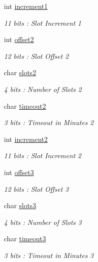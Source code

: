 \begin{DoxyCompactItemize}
int \mbox{\hyperlink{structaismsg__20_a73c4ecb586e692600dc98cc4655d29c2}{increment1}}
\begin{DoxyCompactList}\small\item\em 11 bits \+: Slot Increment 1 \end{DoxyCompactList}\item 
int \mbox{\hyperlink{structaismsg__20_a19dde01a8ac18f0a0d1521e455201fe0}{offset2}}
\begin{DoxyCompactList}\small\item\em 12 bits \+: Slot Offset 2 \end{DoxyCompactList}\item 
char \mbox{\hyperlink{structaismsg__20_a2e3999af7e254deac7f86245d3ec891d}{slots2}}
\begin{DoxyCompactList}\small\item\em 4 bits \+: Number of Slots 2 \end{DoxyCompactList}\item 
char \mbox{\hyperlink{structaismsg__20_a6eef4d0867c10f840b4ee96e9ac2a4b9}{timeout2}}
\begin{DoxyCompactList}\small\item\em 3 bits \+: Timeout in Minutes 2 \end{DoxyCompactList}\item 
int \mbox{\hyperlink{structaismsg__20_a964514d7a9f6640f60363c94c9189a7e}{increment2}}
\begin{DoxyCompactList}\small\item\em 11 bits \+: Slot Increment 2 \end{DoxyCompactList}\item 
int \mbox{\hyperlink{structaismsg__20_aa33b542acaae7e7bdd0a44360cb516a8}{offset3}}
\begin{DoxyCompactList}\small\item\em 12 bits \+: Slot Offset 3 \end{DoxyCompactList}\item 
char \mbox{\hyperlink{structaismsg__20_a8cdce213a8704d661a50d63423347ede}{slots3}}
\begin{DoxyCompactList}\small\item\em 4 bits \+: Number of Slots 3 \end{DoxyCompactList}\item 
char \mbox{\hyperlink{structaismsg__20_ad61bf55a8dd0853d63c25c4ab47c4cf2}{timeout3}}
\begin{DoxyCompactList}\small\item\em 3 bits \+: Timeout in Minutes 3 \end{DoxyCompactList}\item 

\end{DoxyCompactItemize}
